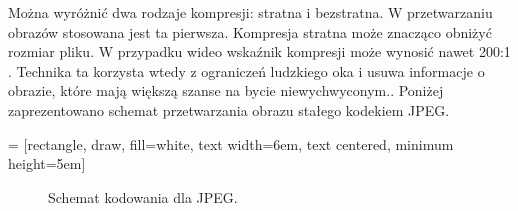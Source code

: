 Można wyróżnić dwa rodzaje kompresji: stratna i bezstratna. W przetwarzaniu obrazów stosowana jest ta pierwsza. Kompresja stratna może znacząco obniżyć rozmiar pliku. W przypadku wideo wskaźnik kompresji może wynosić nawet 200:1 \cite{compression_rate}. Technika ta korzysta wtedy z ograniczeń ludzkiego oka i usuwa informacje o obrazie, które mają większą szanse na bycie niewychwyconym.. Poniżej zaprezentowano schemat przetwarzania obrazu stałego kodekiem JPEG.

 = [rectangle, draw, fill=white, text width=6em, text centered, minimum height=5em]

\begin{center}
\begin{figure}
\centering
\caption{Schemat kodowania dla JPEG.}
\end{figure}
\end{center}


